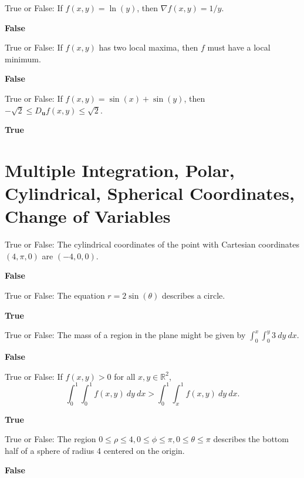 \documentclass{exam}
\newcommand{\R}{\mathbb{R}}
\newcommand{\bu}{\mathbf{u}}
\begin{document}
\begin{questions}
		\question True or False: If $f(x,y)=\ln(y)$, then $\nabla f(x,y)=1/y$.
		\begin{solution}
			\textbf{False}
		\end{solution}
		
		\question True or False: If $f(x,y)$ has two local maxima, then $f$ must have a local minimum.
		\begin{solution}
			\textbf{False}
		\end{solution}
		
		\question True or False: If $f(x,y)=\sin(x)+\sin(y)$, then $-\sqrt{2}\leq D_\bu f(x,y) \leq \sqrt{2}$.
		\begin{solution}
			\textbf{True}
		\end{solution}
		
		\section{Multiple Integration, Polar, Cylindrical, Spherical Coordinates, Change of Variables}
		
		\question True or False:  The cylindrical coordinates of the point with Cartesian coordinates $(4,\pi,0)$ are $(-4,0,0)$. 
		\begin{solution}
		 	\textbf{False}
		 \end{solution}
		
		\question True or False:  The equation $r=2\sin(\theta)$ describes a circle. 
		 \begin{solution}
		 	\textbf{True}
		 \end{solution}
		
		\question True or False:  The mass of a region in the plane might be given by $\displaystyle\int_0^x\int_0^y 3\ dy\ dx.$
		 \begin{solution}
		 	\textbf{False}
		 \end{solution}

		\question True or False:  If $f(x,y)>0$ for all $x,y \in \R^2$, \[\int_0^1\int_0^1 f(x,y) \ dy\ dx > \int_0^1\int_x^1 f(x,y)\ dy\ dx. \]
		\begin{solution}
			\textbf{True}
		\end{solution}

		\question True or False:  The region $0\leq \rho \leq 4, 0 \leq \phi \leq \pi, 0\leq \theta \leq \pi$ describes the bottom half of a sphere of radius 4 centered on the origin.
		 \begin{solution}
		 	\textbf{False}
		 \end{solution}
		

\end{questions}
\end{document}

